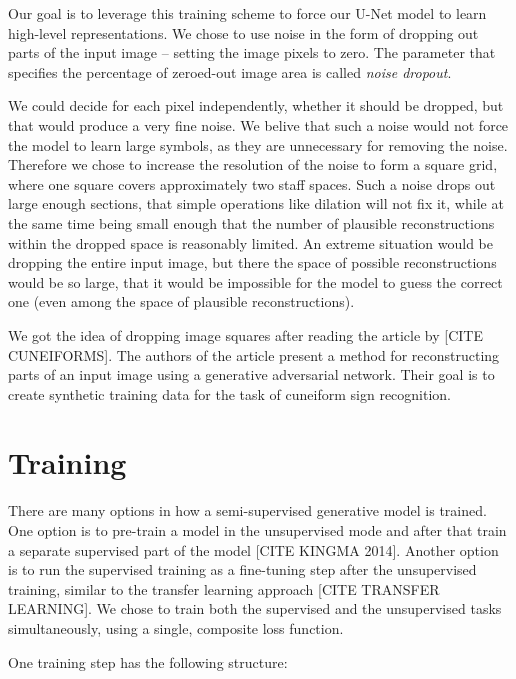 Our goal is to leverage this training scheme to force our U-Net model to learn high-level representations. We chose to use noise in the form of dropping out parts of the input image -- setting the image pixels to zero. The parameter that specifies the percentage of zeroed-out image area is called \emph{noise dropout}.

We could decide for each pixel independently, whether it should be dropped, but that would produce a very fine noise. We belive that such a noise would not force the model to learn large symbols, as they are unnecessary for removing the noise. Therefore we chose to increase the resolution of the noise to form a square grid, where one square covers approximately two staff spaces. Such a noise drops out large enough sections, that simple operations like dilation will not fix it, while at the same time being small enough that the number of plausible reconstructions within the dropped space is reasonably limited. An extreme situation would be dropping the entire input image, but there the space of possible reconstructions would be so large, that it would be impossible for the model to guess the correct one (even among the space of plausible reconstructions).


We got the idea of dropping image squares after reading the article by [CITE CUNEIFORMS]. The authors of the article present a method for reconstructing parts of an input image using a generative adversarial network. Their goal is to create synthetic training data for the task of cuneiform sign recognition.


\section{Training}
\label{sec:Training}

There are many options in how a semi-supervised generative model is trained. One option is to pre-train a model in the unsupervised mode and after that train a separate supervised part of the model [CITE KINGMA 2014]. Another option is to run the supervised training as a fine-tuning step after the unsupervised training, similar to the transfer learning approach [CITE TRANSFER LEARNING]. We chose to train both the supervised and the unsupervised tasks simultaneously, using a single, composite loss function.

One training step has the following structure:

